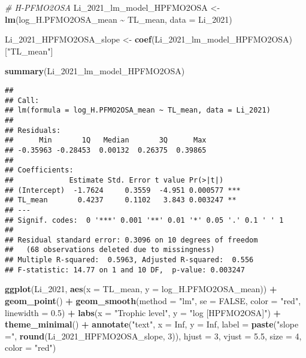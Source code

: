 \documentclass[
]{article}
\newenvironment{Shaded}{\begin{snugshade}}{\end{snugshade}}
\newcommand{\AttributeTok}[1]{\textcolor[rgb]{0.13,0.29,0.53}{#1}}
\newcommand{\CommentTok}[1]{\textcolor[rgb]{0.56,0.35,0.01}{\textit{#1}}}
\newcommand{\ConstantTok}[1]{\textcolor[rgb]{0.56,0.35,0.01}{#1}}
\newcommand{\DecValTok}[1]{\textcolor[rgb]{0.00,0.00,0.81}{#1}}
\newcommand{\FloatTok}[1]{\textcolor[rgb]{0.00,0.00,0.81}{#1}}
\newcommand{\FunctionTok}[1]{\textcolor[rgb]{0.13,0.29,0.53}{\textbf{#1}}}
\newcommand{\NormalTok}[1]{#1}
\newcommand{\OtherTok}[1]{\textcolor[rgb]{0.56,0.35,0.01}{#1}}
\newcommand{\SpecialCharTok}[1]{\textcolor[rgb]{0.81,0.36,0.00}{\textbf{#1}}}
\newcommand{\StringTok}[1]{\textcolor[rgb]{0.31,0.60,0.02}{#1}}
\begin{document}
\begin{Shaded}
\begin{Highlighting}[]
\CommentTok{\# H{-}PFMO2OSA}
\NormalTok{Li\_2021\_lm\_model\_HPFMO2OSA }\OtherTok{\textless{}{-}} \FunctionTok{lm}\NormalTok{(log\_H.PFMO2OSA\_mean }\SpecialCharTok{\textasciitilde{}}\NormalTok{ TL\_mean,}
                                    \AttributeTok{data =}\NormalTok{ Li\_2021)}

\NormalTok{Li\_2021\_HPFMO2OSA\_slope }\OtherTok{\textless{}{-}} \FunctionTok{coef}\NormalTok{(Li\_2021\_lm\_model\_HPFMO2OSA)[}\StringTok{"TL\_mean"}\NormalTok{]}

\FunctionTok{summary}\NormalTok{(Li\_2021\_lm\_model\_HPFMO2OSA)}
\end{Highlighting}
\end{Shaded}

\begin{verbatim}
## 
## Call:
## lm(formula = log_H.PFMO2OSA_mean ~ TL_mean, data = Li_2021)
## 
## Residuals:
##      Min       1Q   Median       3Q      Max 
## -0.35963 -0.28453  0.00132  0.26375  0.39865 
## 
## Coefficients:
##             Estimate Std. Error t value Pr(>|t|)    
## (Intercept)  -1.7624     0.3559  -4.951 0.000577 ***
## TL_mean       0.4237     0.1102   3.843 0.003247 ** 
## ---
## Signif. codes:  0 '***' 0.001 '**' 0.01 '*' 0.05 '.' 0.1 ' ' 1
## 
## Residual standard error: 0.3096 on 10 degrees of freedom
##   (68 observations deleted due to missingness)
## Multiple R-squared:  0.5963, Adjusted R-squared:  0.556 
## F-statistic: 14.77 on 1 and 10 DF,  p-value: 0.003247
\end{verbatim}

\begin{Shaded}
\begin{Highlighting}[]
\FunctionTok{ggplot}\NormalTok{(Li\_2021, }\FunctionTok{aes}\NormalTok{(}\AttributeTok{x =}\NormalTok{ TL\_mean, }\AttributeTok{y =}\NormalTok{ log\_H.PFMO2OSA\_mean)) }\SpecialCharTok{+}
  \FunctionTok{geom\_point}\NormalTok{() }\SpecialCharTok{+}
  \FunctionTok{geom\_smooth}\NormalTok{(}\AttributeTok{method =} \StringTok{"lm"}\NormalTok{, }\AttributeTok{se =} \ConstantTok{FALSE}\NormalTok{, }\AttributeTok{color =} \StringTok{"red"}\NormalTok{, }\AttributeTok{linewidth =} \FloatTok{0.5}\NormalTok{) }\SpecialCharTok{+}
  \FunctionTok{labs}\NormalTok{(}\AttributeTok{x =} \StringTok{"Trophic level"}\NormalTok{,}
       \AttributeTok{y =} \StringTok{"log [HPFMO2OSA]"}\NormalTok{) }\SpecialCharTok{+}
  \FunctionTok{theme\_minimal}\NormalTok{() }\SpecialCharTok{+}
  \FunctionTok{annotate}\NormalTok{(}\StringTok{"text"}\NormalTok{, }\AttributeTok{x =} \ConstantTok{Inf}\NormalTok{, }\AttributeTok{y =} \ConstantTok{Inf}\NormalTok{, }\AttributeTok{label =} \FunctionTok{paste}\NormalTok{(}\StringTok{"slope ="}\NormalTok{, }\FunctionTok{round}\NormalTok{(Li\_2021\_HPFMO2OSA\_slope, }\DecValTok{3}\NormalTok{)), }
           \AttributeTok{hjust =} \DecValTok{3}\NormalTok{, }\AttributeTok{vjust =} \FloatTok{5.5}\NormalTok{, }\AttributeTok{size =} \DecValTok{4}\NormalTok{, }\AttributeTok{color =} \StringTok{"red"}\NormalTok{)}
\end{Highlighting}
\end{Shaded}
\end{document}
